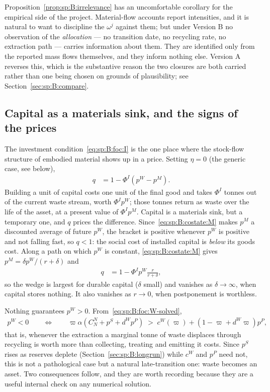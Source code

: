 Proposition~\ref{prop:sp:B:irrelevance} has an uncomfortable corollary for the empirical side of the
project. Material-flow accounts report intensities, and it is natural to want to discipline the
$\omega^j$ against them; but under Version B no observation of the \emph{allocation} --- no transition
date, no recycling rate, no extraction path --- carries information about them. They are identified only
from the reported mass flows themselves, and they inform nothing else. Version A reverses this, which is
the substantive reason the two closures are both carried rather than one being chosen on grounds of
plausibility; see Section~\ref{sec:sp:B:compare}.


\subsection{Capital as a materials sink, and the signs of the prices}\label{sec:sp:B:signs}

The investment condition~\eqref{eq:sp:B:foc:I} is the one place where the stock-flow structure of
embodied material shows up in a price. Setting $\eta=0$ (the generic case, see below),
\begin{align}
q &= 1-\Phi^I\left(p^W-p^M\right).
\label{eq:sp:B:q}
\end{align}
Building a unit of capital costs one unit of the final good and takes $\Phi^I$ tonnes out of the current
waste stream, worth $\Phi^Ip^W$; those tonnes return as waste over the life of the asset, at a present
value of $\Phi^Ip^M$. Capital is a materials sink, but a temporary one, and $q$ prices the difference.
Since~\eqref{eq:sp:B:costate:M} makes $p^M$ a discounted average of future $p^W$, the bracket is
positive whenever $p^W$ is positive and not falling fast, so $q<1$: the social cost of installed capital
is \emph{below} its goods cost. Along a path on which $p^W$ is constant, \eqref{eq:sp:B:costate:M} gives
$p^M=\delta p^W/\left(r+\delta\right)$ and
\begin{align}
q &= 1-\Phi^Ip^W\frac{r}{r+\delta},
\label{eq:sp:B:q-stationary}
\end{align}
so the wedge is largest for durable capital ($\delta$ small) and vanishes as $\delta\to\infty$, when
capital stores nothing. It also vanishes as $r\to0$, when postponement is worthless.

 Nothing guarantees $p^W>0$. From~\eqref{eq:sp:B:foc:W-solved},
\begin{align}
p^W<0
\qquad\Longleftrightarrow\qquad
\varpi\alpha\left(C^N_N+p^S+d^Wp^P\right)
\;>\;
c^W\!\left(\varpi\right)+\left(1-\varpi+d^W\varpi\right)p^P,
\label{eq:sp:B:pW-sign}
\end{align}
that is, whenever the extraction a marginal tonne of waste displaces through recycling is worth more
than collecting, treating and emitting it costs. Since $p^S$ rises as reserves deplete
(Section~\ref{sec:sp:B:longrun}) while $c^W$ and $p^P$ need not, this is not a pathological case but a
natural late-transition one: waste becomes an asset. Two consequences follow, and they are worth
recording because they are a useful internal check on any numerical solution.

